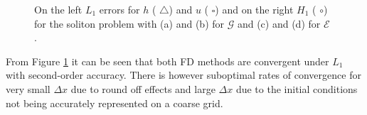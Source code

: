 \documentclass[SingleSpace,12pt,Proceedings]{Serre_ASCE}
\begin{document}
\begin{figure}
\centering
{}
\caption{On the left $L_1$ errors for $h$ ({\color{red} $\triangle$}) and $u$ ({\color{blue} $\square$}) and on the right $H_1$ ({\color{blue} $\circ$}) for the soliton problem with (a) and (b) for $\mathcal{G}$ and (c) and (d) for $\mathcal{E}$ .}
\label{fig:FDMsolnorm}
\end{figure}
%
From Figure \ref{fig:FDMsolnorm} it can be seen that both FD methods are convergent under $L_1$ with second-order accuracy. There is however suboptimal rates of convergence for very small $\Delta x$ due to round off effects and large $\Delta x$ due to the initial conditions not being accurately represented on a coarse grid.  
\end{document}
